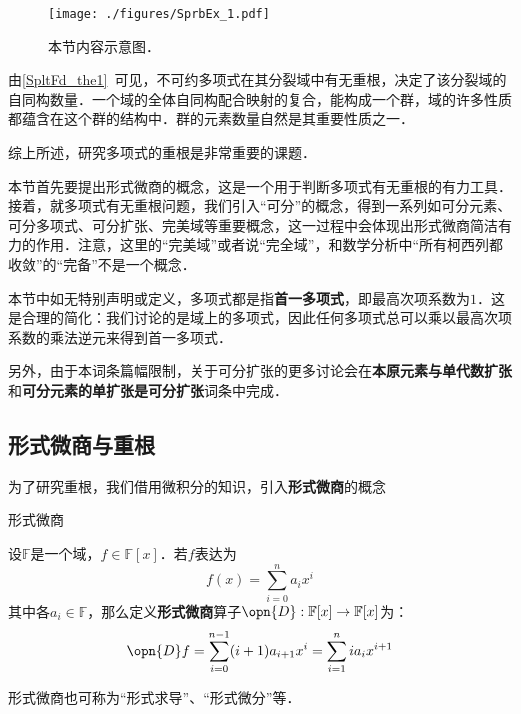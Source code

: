 



\begin{figure}[ht]
\centering
\texttt{[image: ./figures/SprbEx\_1.pdf]}
\caption{本节内容示意图．} \label{SprbEx_fig1}
\end{figure}


由\autoref{SpltFd_the1}~可见，不可约多项式在其分裂域中有无重根，决定了该分裂域的自同构数量．一个域的全体自同构配合映射的复合，能构成一个群，域的许多性质都蕴含在这个群的结构中．群的元素数量自然是其重要性质之一．

综上所述，研究多项式的重根是非常重要的课题．

本节首先要提出形式微商的概念，这是一个用于判断多项式有无重根的有力工具．接着，就多项式有无重根问题，我们引入“可分”的概念，得到一系列如可分元素、可分多项式、可分扩张、完美域等重要概念，这一过程中会体现出形式微商简洁有力的作用．注意，这里的“完美域”或者说“完全域”，和数学分析中“所有柯西列都收敛”的“完备”不是一个概念．

本节中如无特别声明或定义，多项式都是指\textbf{首一多项式}，即最高次项系数为$1$．这是合理的简化：我们讨论的是域上的多项式，因此任何多项式总可以乘以最高次项系数的乘法逆元来得到首一多项式．

另外，由于本词条篇幅限制，关于可分扩张的更多讨论会在\textbf{本原元素与单代数扩张}和\textbf{可分元素的单扩张是可分扩张}词条中完成．

\subsection{形式微商与重根}

为了研究重根，我们借用微积分的知识，引入\textbf{形式微商}的概念

\begin{definition}{形式微商}\label{SprbEx_def1}

设$\mathbb{F}$是一个域，$f\in\mathbb{F}[x]$．若$f$表达为
\begin{equation}
f(x) = \sum_{i=0}^n a_ix^i
\end{equation}
其中各$a_i\in\mathbb{F}$，那么定义\textbf{形式微商}算子$\opn{D}:\mathbb{F}[x]\to\mathbb{F}[x]$为：
\begin{equation}
\opn{D}f = \sum_{i=0}^{n-1} (i+1)a_{i+1}x^i = \sum_{i=1}^{n} ia_{i}x^{i+1}
\end{equation}

形式微商也可称为“形式求导”、“形式微分”等．

\end{definition}


